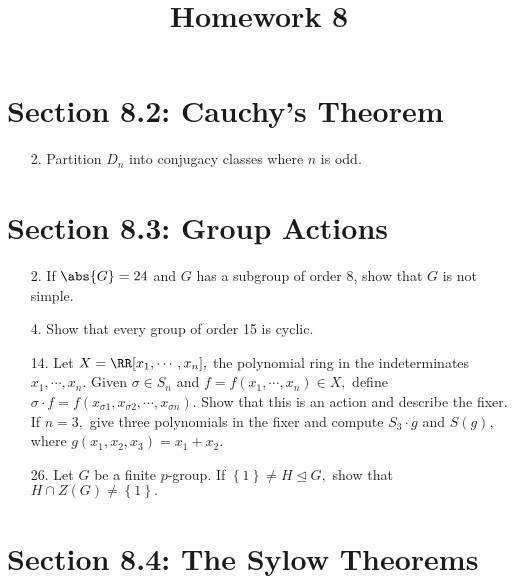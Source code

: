 \documentclass{article}
\begin{document}
\title{Homework 8}
\maketitle
\thispagestyle{fancy}

\section*{Section 8.2: Cauchy's Theorem}

\begin{itemize}
	\item[2.] Partition $D_n$ into conjugacy classes where $n$ is odd.
		
\end{itemize}

\section*{Section 8.3: Group Actions}

\begin{itemize}
	\item[2.] If $\abs{G}=24$ and $G$ has a subgroup of order 8, show that $G$ is not simple.

	\item[4.] Show that every group of order 15 is cyclic.

	\item[14.] Let $X=\RR[x_1, \cdots, x_n],$ the polynomial ring in the indeterminates $x_1,\cdots, x_n.$ Given $\sigma\in S_n$ and $f=f(x_1, \cdots, x_n)\in X,$ define $\sigma\cdot f = f(x_{\sigma1}, x_{\sigma2}, \cdots, x_{\sigma n}).$ Show that this is an action and describe the fixer. If $n=3,$ give three polynomials in the fixer and compute $S_3\cdot g$ and $S(g),$ where $g(x_1, x_2, x_3)=x_1+x_2.$

	\item[26.] Let $G$ be a finite $p$-group. If $\left\{ 1 \right\}\neq H\unlhd G,$ show that $H\cap Z(G)\neq \left\{ 1 \right\}.$ 
		
\end{itemize}

\section*{Section 8.4: The Sylow Theorems}
\end{document}
